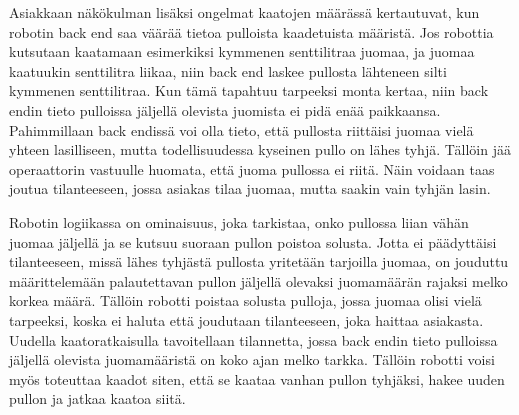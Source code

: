 Asiakkaan näkökulman lisäksi ongelmat kaatojen määrässä kertautuvat, kun robotin back end saa väärää tietoa pulloista kaadetuista määristä. Jos robottia kutsutaan kaatamaan esimerkiksi kymmenen senttilitraa juomaa, ja juomaa kaatuukin senttilitra liikaa, niin back end laskee pullosta lähteneen silti kymmenen senttilitraa. Kun tämä tapahtuu tarpeeksi monta kertaa, niin back endin tieto pulloissa jäljellä olevista juomista ei pidä enää paikkaansa. Pahimmillaan back endissä voi olla tieto, että pullosta riittäisi juomaa vielä yhteen lasilliseen, mutta todellisuudessa kyseinen pullo on lähes tyhjä. Tällöin jää operaattorin vastuulle huomata, että juoma pullossa ei riitä. Näin voidaan taas joutua tilanteeseen, jossa asiakas tilaa juomaa, mutta saakin vain tyhjän lasin.

Robotin logiikassa on ominaisuus, joka tarkistaa, onko pullossa liian vähän juomaa jäljellä ja se kutsuu suoraan pullon poistoa solusta. Jotta ei päädyttäisi tilanteeseen, missä lähes tyhjästä pullosta yritetään tarjoilla juomaa, on jouduttu määrittelemään palautettavan pullon jäljellä olevaksi juomamäärän rajaksi melko korkea määrä. Tällöin robotti poistaa solusta pulloja, jossa juomaa olisi vielä tarpeeksi, koska ei haluta että joudutaan tilanteeseen, joka haittaa asiakasta. Uudella kaatoratkaisulla tavoitellaan tilannetta, jossa back endin tieto pulloissa jäljellä olevista juomamääristä on koko ajan melko tarkka. Tällöin robotti voisi myös toteuttaa kaadot siten, että se kaataa vanhan pullon tyhjäksi, hakee uuden pullon ja jatkaa kaatoa siitä.
